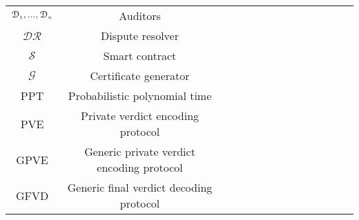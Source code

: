 \begin{table}[!htbp]
\begin{scriptsize}
\begin{center}
{{\begin{tabular}{|c|c|c|c|c|c|c|c|c|c|c|c|c|c|}
%  
\cellcolor{gray!20}\scriptsize$\mathcal{D}_{\scriptscriptstyle 1},... , \mathcal{D}_{\scriptscriptstyle n}$ &\cellcolor{gray!20}\scriptsize Auditors  \\  
%
\cellcolor{white!20}\scriptsize$\mathcal{DR}$ &\cellcolor{white!20}\scriptsize Dispute resolver  \\  
%
\cellcolor{gray!20}\scriptsize$\mathcal{S}$ &\cellcolor{gray!20}\scriptsize Smart contract  \\  
%
\cellcolor{white!20}\scriptsize$\mathcal{G}$ &\cellcolor{white!20}\scriptsize Certificate generator  \\  
%
%
\cellcolor{gray!20}\scriptsize PPT&\cellcolor{gray!20}\scriptsize  Probabilistic polynomial time \\    
%
\cellcolor{white!20}\scriptsize{PVE} &\cellcolor{white!20}\scriptsize  Private verdict encoding  protocol\\ 
%
%
\cellcolor{white!20}\scriptsize{GPVE} &\cellcolor{white!20}\scriptsize  Generic private verdict encoding protocol\\ 
%
\cellcolor{gray!20}\scriptsize{GFVD} &\cellcolor{gray!20}\scriptsize  Generic final verdict decoding protocol\\ 
%

%

%

%
%
%


\end{tabular}}}
\end{center}
\end{scriptsize}
\end{table}
